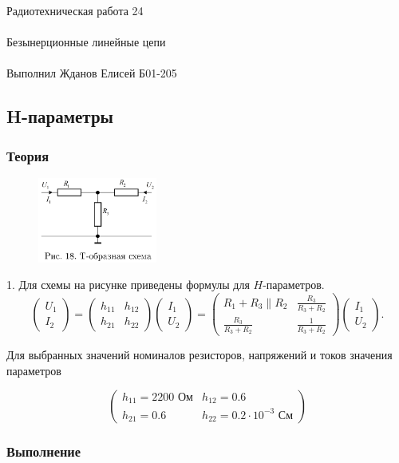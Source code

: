 \documentclass{astroedu-lab}
\begin{document}
\begin{problem}{\huge Радиотехническая работа 24\\\\Безынерционные линейные цепи\\\\Выполнил Жданов Елисей Б01-205}
\subsection{H-параметры}

\subsubsection{Теория}

\begin{figure}[!h]
	\centering
	\includegraphics[width=0.35\textwidth]{18.png}
	\label{fig:boiler}
\end{figure}

1. Для схемы на рисунке приведены формулы для $H$-параметров.
$$
\left(\begin{array}{c}
U_1 \\
I_2
\end{array}\right)=\left(\begin{array}{ll}
h_{11} & h_{12} \\
h_{21} & h_{22}
\end{array}\right)\left(\begin{array}{c}
I_1 \\
U_2
\end{array}\right)=\left(\begin{array}{cc}
R_1+R_3 \| R_2 & \frac{R_3}{R_3+R_2} \\
\frac{R_3}{R_3+R_2} & \frac{1}{R_3+R_2}
\end{array}\right)\left(\begin{array}{c}
I_1 \\
U_2
\end{array}\right) .
$$

Для выбранных значений номиналов резисторов, напряжений и токов значения параметров

$$
\left(\begin{array}{ll}
h_{11} = 2200 \text{ Ом} & h_{12} = 0.6 \\
h_{21} = 0.6 & h_{22} = 0.2 \cdot 10^{-3} \text{ См}
\end{array}\right)
$$

\subsubsection{Выполнение}


\end{problem}
\end{document}
